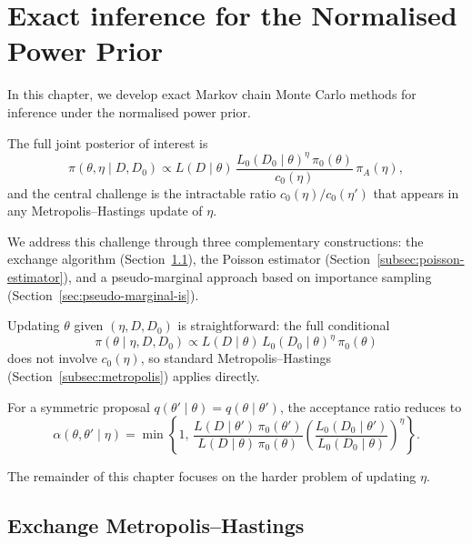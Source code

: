 \chapter{Exact inference for the Normalised Power Prior}
\label{sec:exact}

In this chapter, we develop exact Markov chain Monte Carlo methods for inference under the normalised power prior.

The full joint posterior of interest is
\begin{equation}
    \pi(\theta, \eta \mid D, D_0)
    \propto
    L(D \mid \theta)\,
    \frac{L_0(D_0 \mid \theta)^{\eta}\, \pi_0(\theta)}{c_0(\eta)}\,
    \pi_A(\eta),
    \label{eq:full-posterior-exact}
\end{equation}
and the central challenge is the intractable ratio $c_0(\eta)/c_0(\eta')$ that appears in any Metropolis--Hastings update of $\eta$.

We address this challenge through three complementary constructions: the exchange algorithm (Section~\ref{sec:exact-exchange}), the Poisson estimator (Section~\ref{subsec:poisson-estimator}), and a pseudo-marginal approach based on importance sampling (Section~\ref{sec:pseudo-marginal-is}).

Updating $\theta$ given $(\eta, D, D_0)$ is straightforward: the full conditional
\begin{equation}
    \pi(\theta \mid \eta, D, D_0) \propto L(D \mid \theta)\, L_0(D_0 \mid \theta)^{\eta}\, \pi_0(\theta)
    \label{eq:theta-full-conditional}
\end{equation}
does not involve $c_0(\eta)$, so standard Metropolis--Hastings (Section~\ref{subsec:metropolis}) applies directly.

For a symmetric proposal $q(\theta' \mid \theta) = q(\theta \mid \theta')$, the acceptance ratio reduces to
\begin{equation}
    \alpha(\theta, \theta' \mid \eta)
    =
    \min\!\left\{1,\,
    \frac{L(D \mid \theta')\,\pi_0(\theta')}{L(D \mid \theta)\,\pi_0(\theta)}
    \left(\frac{L_0(D_0 \mid \theta')}{L_0(D_0 \mid \theta)}\right)^{\!\eta}
    \right\}.
\end{equation}

The remainder of this chapter focuses on the harder problem of updating $\eta$.

\section{Exchange Metropolis--Hastings}
\label{sec:exact-exchange}

